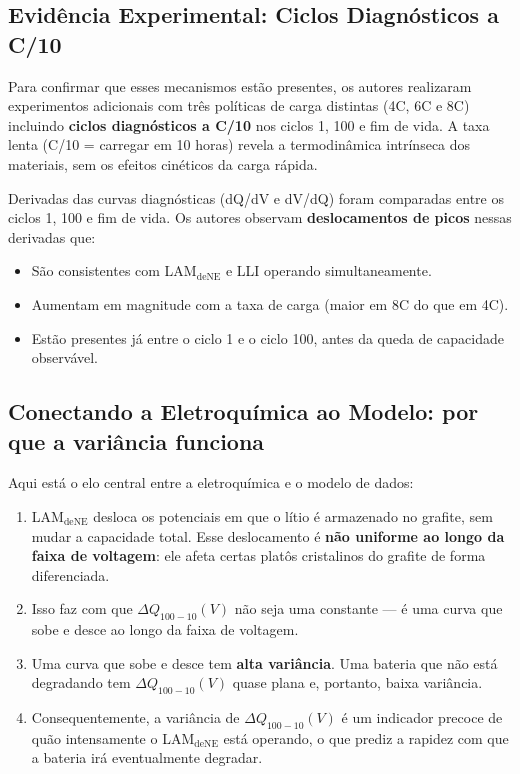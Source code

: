 \documentclass[12pt,a4paper]{article}
\begin{document}
\subsection{Evid\^{e}ncia Experimental: Ciclos Diagn\'{o}sticos a C/10}

Para confirmar que esses mecanismos est\~ao presentes, os autores realizaram
experimentos adicionais com tr\^{e}s pol\'{i}ticas de carga distintas (4C, 6C e 8C)
incluindo \textbf{ciclos diagn\'{o}sticos a C/10} nos ciclos 1, 100 e fim de vida.
A taxa lenta (C/10 = carregar em 10 horas) revela a termodin\^{a}mica intr\'{i}nseca
dos materiais, sem os efeitos cin\'{e}ticos da carga r\'{a}pida.

Derivadas das curvas diagn\'{o}sticas (dQ/dV e dV/dQ) foram comparadas entre
os ciclos 1, 100 e fim de vida. Os autores observam \textbf{deslocamentos de picos}
nessas derivadas que:

\begin{itemize}
  \item S\~ao consistentes com LAM$_\text{deNE}$ e LLI operando simultaneamente.
  \item Aumentam em magnitude com a taxa de carga (maior em 8C do que em 4C).
  \item Est\~ao presentes j\'{a} entre o ciclo 1 e o ciclo 100, antes da queda
    de capacidade observ\'{a}vel.
\end{itemize}

\subsection{Conectando a Eletroqu\'{i}mica ao Modelo: por que a vari\^{a}ncia funciona}

Aqui est\'{a} o elo central entre a eletroqu\'{i}mica e o modelo de dados:

\begin{enumerate}
  \item LAM$_\text{deNE}$ desloca os potenciais em que o l\'{i}tio \'{e} armazenado
    no grafite, sem mudar a capacidade total. Esse deslocamento \'{e} \textbf{n\~ao
    uniforme ao longo da faixa de voltagem}: ele afeta certas plat\^os
    cristalinos do grafite de forma diferenciada.
  \item Isso faz com que $\Delta Q_{100-10}(V)$ n\~ao seja uma constante --- \'{e}
    uma curva que sobe e desce ao longo da faixa de voltagem.
  \item Uma curva que sobe e desce tem \textbf{alta vari\^{a}ncia}. Uma bateria
    que n\~ao est\'{a} degradando tem $\Delta Q_{100-10}(V)$ quase plana e,
    portanto, baixa vari\^{a}ncia.
  \item Consequentemente, a vari\^{a}ncia de $\Delta Q_{100-10}(V)$ \'{e} um
    indicador precoce de qu\~ao intensamente o LAM$_\text{deNE}$ est\'{a} operando,
    o que prediz a rapidez com que a bateria ir\'{a} eventualmente degradar.
\end{enumerate}
\end{document}
